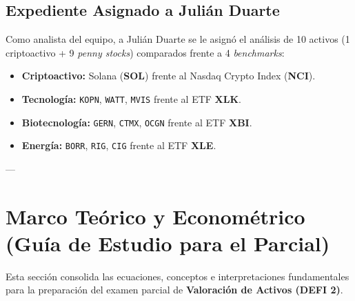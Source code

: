 \documentclass[11pt,a4paper]{article}
\begin{document}
\subsection{Expediente Asignado a Julián Duarte}
Como analista del equipo, a Julián Duarte se le asignó el análisis de 10 activos (1 criptoactivo + 9 \textit{penny stocks}) comparados frente a 4 \textit{benchmarks}:
\begin{itemize}
    \item \textbf{Criptoactivo:} Solana (\textbf{SOL}) frente al Nasdaq Crypto Index (\textbf{NCI}).
    \item \textbf{Tecnología:} \texttt{KOPN}, \texttt{WATT}, \texttt{MVIS} frente al ETF \textbf{XLK}.
    \item \textbf{Biotecnología:} \texttt{GERN}, \texttt{CTMX}, \texttt{OCGN} frente al ETF \textbf{XBI}.
    \item \textbf{Energía:} \texttt{BORR}, \texttt{RIG}, \texttt{CIG} frente al ETF \textbf{XLE}.
\end{itemize}

---

\section{Marco Teórico y Econométrico (Guía de Estudio para el Parcial)}

Esta sección consolida las ecuaciones, conceptos e interpretaciones fundamentales para la preparación del examen parcial de \textbf{Valoración de Activos (DEFI 2)}.
\end{document}
